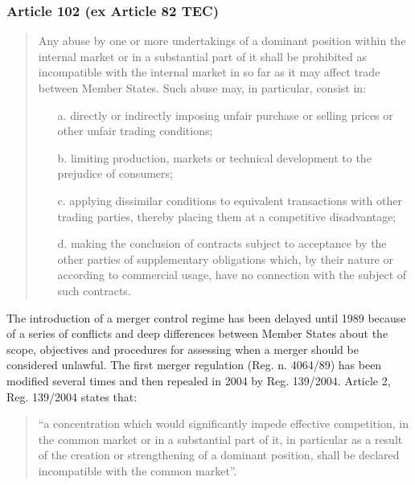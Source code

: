         \subsubsection{Article 102 (ex Article 82 TEC)}

            \begin{quote}
                Any abuse by one or more undertakings of a dominant position within the internal market or in a substantial part of it shall be prohibited as incompatible with the internal market in so far as it may affect trade between Member States.
                Such abuse may, in particular, consist in:
                    \begin{itemize}
                        \item[a.] directly or indirectly imposing unfair purchase or selling prices or other unfair trading conditions;
                        \item[b.] limiting production, markets or technical development to the prejudice of consumers;
                        \item[c.] applying dissimilar conditions to equivalent transactions with other trading parties, thereby placing them at a competitive disadvantage;
                        \item[d.] making the conclusion of contracts subject to acceptance by the other parties of supplementary obligations which, by their nature or according to commercial usage, have no connection with the subject of such contracts.
                    \end{itemize}
            \end{quote}


        The introduction of a merger control regime has been delayed until 1989 because of a series of conflicts and deep differences between Member States about the scope, objectives and procedures for assessing when a merger should be considered unlawful.
        The first merger regulation (Reg. n. 4064/89) has been modified several times and then repealed in 2004 by Reg. 139/2004. 
        Article 2, Reg. 139/2004 states that:
            \begin{quote}
                 “a concentration which would significantly impede effective competition, in the common market or in a substantial part of it, in particular as a result of the creation or strengthening of a dominant position, shall be declared incompatible with the common market”.
            \end{quote}

